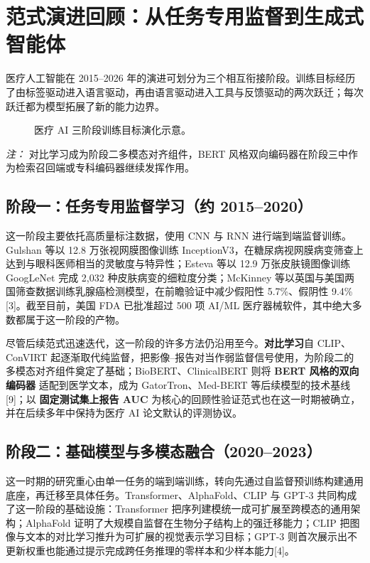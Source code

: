 \section{范式演进回顾：从任务专用监督到生成式智能体}

医疗人工智能在 2015--2026 年的演进可划分为三个相互衔接阶段。训练目标经历了由标签驱动进入语言驱动，再由语言驱动进入工具与反馈驱动的两次跃迁；每次跃迁都为模型拓展了新的能力边界。

\begin{figure}[htbp]
  \centering
  \caption{医疗 AI 三阶段训练目标演化示意。}
  \label{fig:paradigm-evolution}
\end{figure}

\noindent\textit{注：} 对比学习成为阶段二多模态对齐组件，BERT 风格双向编码器在阶段三中作为检索召回端或专科编码器继续发挥作用。

\subsection{阶段一：任务专用监督学习（约 2015--2020）}

这一阶段主要依托高质量标注数据，使用 CNN 与 RNN 进行端到端监督训练。Gulshan 等以 12.8 万张视网膜图像训练 InceptionV3，在糖尿病视网膜病变筛查上达到与眼科医师相当的灵敏度与特异性；Esteva 等以 12.9 万张皮肤镜图像训练 GoogLeNet 完成 2,032 种皮肤病变的细粒度分类；McKinney 等以英国与美国两国筛查数据训练乳腺癌检测模型，在前瞻验证中减少假阳性 5.7\%、假阴性 9.4\%[3]。截至目前，美国 FDA 已批准超过 500 项 AI/ML 医疗器械软件，其中绝大多数都属于这一阶段的产物。

尽管后续范式迅速迭代，这一阶段的许多方法仍沿用至今。\textbf{对比学习}自 CLIP、ConVIRT 起逐渐取代纯监督，把影像--报告对当作弱监督信号使用，为阶段二的多模态对齐组件奠定了基础；BioBERT、ClinicalBERT 则将 \textbf{BERT 风格的双向编码器} 适配到医学文本，成为 GatorTron、Med-BERT 等后续模型的技术基线[9]；以 \textbf{固定测试集上报告 AUC} 为核心的回顾性验证范式也在这一时期被确立，并在后续多年中保持为医疗 AI 论文默认的评测协议。

\subsection{阶段二：基础模型与多模态融合（2020--2023）}

这一时期的研究重心由单一任务的端到端训练，转向先通过自监督预训练构建通用底座，再迁移至具体任务。Transformer、AlphaFold、CLIP 与 GPT-3 共同构成了这一阶段的基础设施：Transformer 把序列建模统一成可扩展至跨模态的通用架构；AlphaFold 证明了大规模自监督在生物分子结构上的强迁移能力；CLIP 把图像与文本的对比学习推升为可扩展的视觉表示学习目标；GPT-3 则首次展示出不更新权重也能通过提示完成跨任务推理的零样本和少样本能力[4]。

